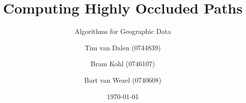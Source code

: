 \documentclass[english,aspectratio=43]{beamer}
\title{Computing Highly Occluded Paths}
\subtitle{Algorithms for Geographic Data}
\author[Group 10]{
	Tim van Dalen (0744839)
	\and
	Bram Kohl (0746107)
	\and
	Bart van Wezel (0740608)
}
\institute[TU/e]
{
    WIS\\
	Eindhoven University of Technology
}
\date{\today}
\begin{document}
	\begin{frame}
		\titlepage
	\end{frame}

	\begin{frame}{}
	\end{frame}
\end{document}
